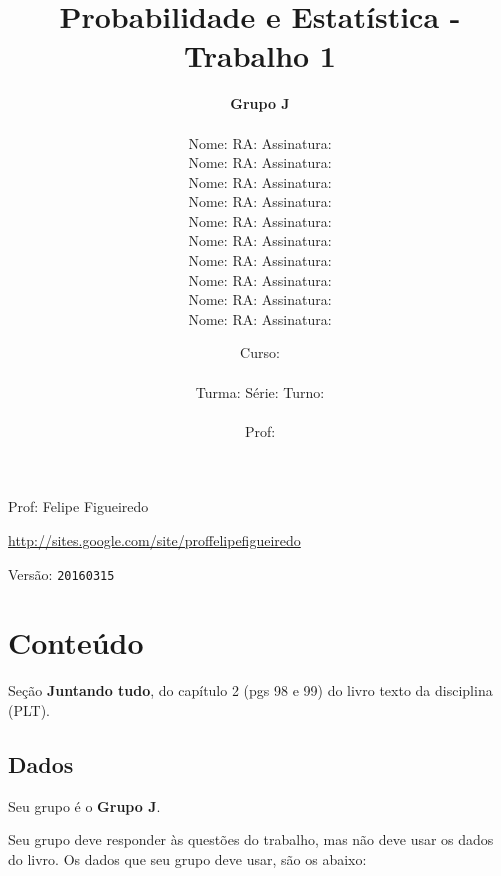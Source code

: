 \documentclass[a4paper]{article}
\date{
\bigskip
Curso: \underline{\hspace{8cm}}\\
\ \\
Turma: \underline{\hspace{1cm}} Série: \underline{\hspace{1cm}} Turno:
\underline{\hspace{1cm}}\\
\ \\
Prof: \underline{\hspace{8cm}}\\
}
\title{Probabilidade e Estatística - Trabalho 1}
\author{
{\bf Grupo J}\\
\ \\
Nome: \underline{\hspace{6cm}} RA: \underline{\hspace{2cm}} Assinatura: \underline{\hspace{4cm}}\\
Nome: \underline{\hspace{6cm}} RA: \underline{\hspace{2cm}} Assinatura: \underline{\hspace{4cm}}\\
Nome: \underline{\hspace{6cm}} RA: \underline{\hspace{2cm}} Assinatura: \underline{\hspace{4cm}}\\
Nome: \underline{\hspace{6cm}} RA: \underline{\hspace{2cm}} Assinatura: \underline{\hspace{4cm}}\\
Nome: \underline{\hspace{6cm}} RA: \underline{\hspace{2cm}} Assinatura: \underline{\hspace{4cm}}\\
Nome: \underline{\hspace{6cm}} RA: \underline{\hspace{2cm}} Assinatura: \underline{\hspace{4cm}}\\
Nome: \underline{\hspace{6cm}} RA: \underline{\hspace{2cm}} Assinatura: \underline{\hspace{4cm}}\\
Nome: \underline{\hspace{6cm}} RA: \underline{\hspace{2cm}} Assinatura: \underline{\hspace{4cm}}\\
Nome: \underline{\hspace{6cm}} RA: \underline{\hspace{2cm}} Assinatura: \underline{\hspace{4cm}}\\
Nome: \underline{\hspace{6cm}} RA: \underline{\hspace{2cm}} Assinatura: \underline{\hspace{4cm}}\\
}
\begin{document}
\maketitle
\newpage

\parbox[c]{.825\textwidth}{\raggedright%
{Prof: Felipe Figueiredo\par}
{\url{http://sites.google.com/site/proffelipefigueiredo}\par}
}

Versão: \verb|20160315|




\section{Conteúdo}

Seção {\bf Juntando tudo}, do capítulo 2 (pgs 98 e 99) do livro texto da disciplina (PLT). 

\subsection{Dados}
Seu grupo é o {\bf Grupo J}.

Seu grupo deve responder às questões do trabalho, mas não deve usar os dados do livro. Os dados que seu grupo deve usar, são os abaixo:
\end{document}
